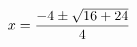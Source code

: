 \documentclass[preview]{standalone}
\begin{document}
\begin{align*}
\special{dvisvgm:raw <g id='unique000'>}x=\frac{-4\pm\sqrt{16+24}}{4}\special{dvisvgm:raw </g>}
\end{align*}
\end{document}
